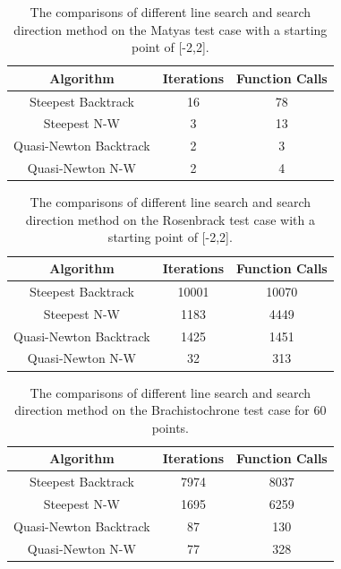 \documentclass{article}
\begin{document}
\begin{table}[htb]
	\centering
	\caption{The comparisons of different line search and search direction method on the Matyas test case with a starting point of [-2,2].}
	\label{tab:matyas}
	\begin{tabular}{c|c|c}
		\toprule
		Algorithm & Iterations & Function Calls \\
		\midrule
		Steepest Backtrack & 16 & 78 \\
		Steepest N-W & 3 & 13 \\
		Quasi-Newton Backtrack &  2 & 3  \\
		Quasi-Newton N-W & 2 & 4 \\
		\bottomrule
	\end{tabular}
\end{table}

\begin{table}[htb]
	\centering
	\caption{The comparisons of different line search and search direction method on the Rosenbrack test case with a starting point of [-2,2].}
	\label{tab:rosen}
	\begin{tabular}{c|c|c}
		\toprule
		Algorithm & Iterations & Function Calls \\
		\midrule
		Steepest Backtrack & 10001 & 10070 \\
		Steepest N-W & 1183 & 4449 \\
		Quasi-Newton Backtrack & 1425 & 1451 \\
		Quasi-Newton N-W & 32 & 313 \\
		\bottomrule
	\end{tabular}
\end{table}

\begin{table}[htb]
	\centering
	\caption{The comparisons of different line search and search direction method on the Brachistochrone test case for 60 points.}
	\label{tab:brach}
	\begin{tabular}{c|c|c}
		\toprule
		Algorithm & Iterations & Function Calls \\
		\midrule
		Steepest Backtrack & 7974 & 8037 \\
		Steepest N-W & 1695 & 6259 \\
		Quasi-Newton Backtrack & 87 & 130 \\
		Quasi-Newton N-W & 77 & 328 \\
		\bottomrule
	\end{tabular}
\end{table}
\end{document}
